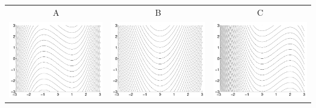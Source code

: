 \begin{tabular}{ccc}
A & B & C \\[15pt]
%
\includegraphics[width=\len]{images/module8-figs-1.png}
	& \includegraphics[width=\len]{images/module8-figs-5.png}
	& \includegraphics[width=\len]{images/module8-figs-4.png} \\

\end{tabular}
